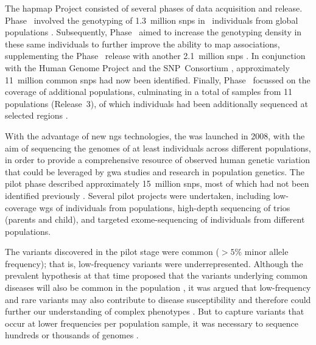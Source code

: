 The \gls{hapmap} Project consisted of several phases of data acquisition and release.
Phase~ involved the genotyping of 1.3~million \glspl{snp} in ~individuals from  global populations \citep{Thorisson:2005ff}.
Subsequently, Phase~ aimed to increase the genotyping density in these same individuals to further improve the ability to map associations, supplementing the Phase~ release with another 2.1~million \glspl{snp} \citep{Frazer:2007kha}.
In conjunction with the Human Genome Project and the SNP~Consortium \citep{McCarroll:2008dy}, approximately 11~million common \glspl{snp} had now been identified.
Finally, Phase~ focussed on the coverage of additional populations, culminating in a total of  samples from 11 populations (Release~3), of which  individuals had been additionally sequenced at selected regions \citep{InternationalHapMapConsortium:2010en}.

With the advantage of new \gls{ngs} technologies, the  was launched in 2008, with the aim of sequencing the genomes of at least  individuals across different populations, in order to provide a comprehensive resource of observed human genetic variation that could be leveraged by \gls{gwa} studies and research in population genetics.
The pilot phase described approximately 15~million \glspl{snp}, most of which had not been identified previously \citep{Durbin:2010gj}.
Several pilot projects were undertaken, including low-coverage \gls{wgs} of  individuals from  populations, high-depth sequencing of  trios (parents and child), and targeted exome-sequencing of  individuals from  different populations.

The variants discovered in the pilot stage were common ($>5\%$ minor allele frequency); that is, low-frequency variants were underrepresented.
Although the prevalent hypothesis at that time proposed that the variants underlying common diseases will also be common in the population \citep{Lander:1996fj,Chakravarti:1999ic}, it was argued that low-frequency and rare variants may also contribute to disease susceptibility and therefore could further our understanding of complex phenotypes \citep{Pritchard:2001hw}.
But to capture variants that occur at lower frequencies per population sample, it was necessary to sequence hundreds or thousands of genomes \citep{Kaiser:2008wd}.




%

%

